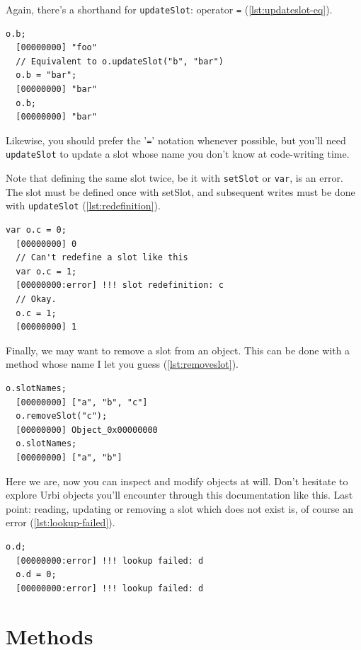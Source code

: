\documentclass[openright,twoside,12pt]{report}
\newcommand{\urbi}{Urbi\xspace}
\newcommand{\lst}[1]{\autoref{lst:#1}}
\begin{document}
Again, there's a shorthand for \texttt{updateSlot}: operator
\texttt{=} (\lst{updateslot-eq}).

\begin{lstlisting}[caption=Updating a slot with '\texttt{=}',
  label=lst:updateslot-eq]
  o.b;
  [00000000] "foo"
  // Equivalent to o.updateSlot("b", "bar")
  o.b = "bar";
  [00000000] "bar"
  o.b;
  [00000000] "bar"
\end{lstlisting}

Likewise, you should prefer the '\texttt{=}' notation whenever
possible, but you'll need \texttt{updateSlot} to update a slot whose
name you don't know at code-writing time.

Note that defining the same slot twice, be it with \texttt{setSlot} or
\texttt{var}, is an error. The slot must be defined once with setSlot,
and subsequent writes must be done with \texttt{updateSlot}
(\lst{redefinition}).

\begin{lstlisting}[caption=Defining a slot twice is an error,
  label=lst:redefinition]
  var o.c = 0;
  [00000000] 0
  // Can't redefine a slot like this
  var o.c = 1;
  [00000000:error] !!! slot redefinition: c
  // Okay.
  o.c = 1;
  [00000000] 1
\end{lstlisting}

Finally, we may want to remove a slot from an object. This can be done
with a method whose name I let you guess (\lst{removeslot}).

\begin{lstlisting}[caption=Removing a slot, label=lst:removeslot]
  o.slotNames;
  [00000000] ["a", "b", "c"]
  o.removeSlot("c");
  [00000000] Object_0x00000000
  o.slotNames;
  [00000000] ["a", "b"]
\end{lstlisting}

Here we are, now you can inspect and modify objects at will. Don't
hesitate to explore \urbi objects you'll encounter through this
documentation like this. Last point: reading, updating or removing a
slot which does not exist is, of course an error
(\lst{lookup-failed}).

\begin{lstlisting}[caption=Manipulating existent slot is an error,
  label=lst:lookup-failed]
  o.d;
  [00000000:error] !!! lookup failed: d
  o.d = 0;
  [00000000:error] !!! lookup failed: d
\end{lstlisting}

\section{Methods}
\end{document}
